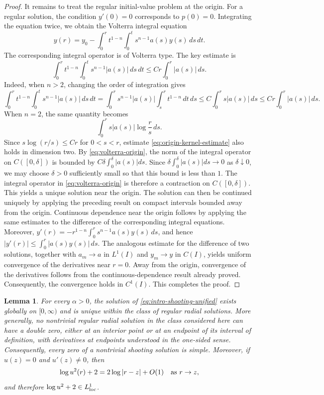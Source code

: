 \documentclass[11pt]{article}
\newtheorem{lemma}[theorem]{Lemma}
\begin{document}
\begin{proof}
It remains to treat the regular initial-value problem at the origin. For a regular solution, the condition $y'(0)=0$ corresponds to $p(0)=0$. Integrating the equation twice, we obtain the Volterra integral equation
\begin{equation}\label{eq:volterra-origin}
 y(r)=y_0-\int_0^r t^{1-n}\int_0^t s^{n-1}a(s)y(s)\,ds\,dt.
\end{equation}
The corresponding integral operator is of Volterra type. The key estimate is
\begin{equation}\label{eq:origin-kernel-estimate}
 \int_0^r t^{1-n}\int_0^t s^{n-1}|a(s)|\,ds\,dt
 \leq C r\int_0^r |a(s)|\,ds.
\end{equation}
Indeed, when $n>2$, changing the order of integration gives
\[
 \int_0^r t^{1-n}\int_0^t s^{n-1}|a(s)|\,ds\,dt=\int_0^r s^{n-1}|a(s)|\int_s^r t^{1-n}\,dt\,ds
 \leq C\int_0^r s|a(s)|\,ds
 \leq C r\int_0^r |a(s)|\,ds.
\]
When $n=2$, the same quantity becomes
\[
 \int_0^r s|a(s)|\log\frac r s\,ds.
\]
 Since $s\log(r/s)\leq C r$ for $0<s<r$, estimate \eqref{eq:origin-kernel-estimate} also holds in dimension two. By \eqref{eq:volterra-origin}, the norm of the integral operator on $C([0,\delta])$ is bounded by
$C\delta\int_0^\delta |a(s)|ds$.
Since $\delta\int_0^\delta |a(s)|ds\rightarrow0$ as $\delta\downarrow0$, we may choose $\delta>0$  sufficiently small so that this bound is less than $1$. The integral operator in \eqref{eq:volterra-origin} is therefore a contraction on $C([0,\delta])$. This yields a unique solution near the origin. The solution can then be continued uniquely by applying the preceding result on compact intervals bounded away from the origin.
 Continuous dependence near the origin follows by applying the same estimates to the difference of the corresponding integral equations. Moreover, $y'(r)=-r^{1-n}\int_0^r s^{n-1}a(s)y(s)\,ds$,
 and hence
 $|y'(r)|\leq\int_0^r |a(s)y(s)|\,ds$. The analogous estimate for the difference of two solutions, together with $a_m\rightarrow a$ in $L^1(I)$ and $y_m\rightarrow y$ in $C(I)$, yields uniform convergence of the derivatives near $r=0$. Away from the origin, convergence of the derivatives follows from the continuous-dependence result already proved. Consequently, the convergence holds in $C^1(I)$. This completes the proof.
\end{proof}

\begin{lemma}\label{lem:log-global}
For every $\alpha>0$, the solution of \eqref{eq:intro-shooting-unified} exists globally on $[0,\infty)$ and is unique within the class of regular radial solutions. More generally, no nontrivial {regular} radial solution {in the class considered here} can have a double zero, either at an interior point or at an endpoint of its interval of definition, with derivatives at endpoints understood in the one-sided sense. Consequently, every zero of a nontrivial shooting solution is simple.
Moreover, if $u(z)=0$ and $u'(z)\ne0$, then
\begin{equation}\label{eq:logL1}
 \log u^2(r)+2=2\log|r-z|+O(1)
 \quad\hbox{as }r\to z,
\end{equation}
and therefore $\log u^2+2\in L^1_{\rm loc}$.
\end{lemma}
\end{document}
